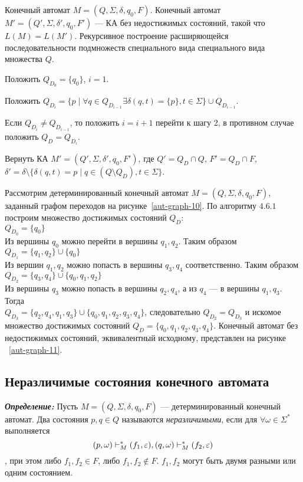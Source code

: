 {
	Конечный автомат $M = (Q,\Sigma, \delta, q_0, F)$.
}
{
	Конечный автомат $M' = (Q',\Sigma, \delta', q_0, F')$ --- КА без недостижимых состояний, такой что $L(M) = L(M')$.
}
{
 Рекурсивное построение расширяющейся последовательности подмножеств специального вида специального вида множества $Q$.
}
{
\item Положить $Q_{D_0}=\{q_0\}$, $i=1$.
\item Положить $Q_{D_i}=\{p \mid  \forall q \in Q_{D_{i-1}} \exists \delta(q, t) = \{p\}, t \in \Sigma  \}\cup Q_{D_{i-1}}$.
\item Если $Q_{D_i}\neq Q_{D_{i-1}}$, то положить $i=i+1$ перейти к шагу 2, в противном случае положить $Q_D=Q_{D_i}$.
\item Вернуть КА $M'=(Q',\Sigma, \delta', q_0, F')$, где $Q'=Q_D\cap Q$, $F'=Q_D\cap F$, $\delta' = \delta \setminus \{ \delta(q, t) = p \mid q \in (Q \setminus Q_D), t \in \Sigma \}$.
}

\begin{myexample}
Рассмотрим детерминированный конечный автомат $M = (Q,\Sigma, \delta, q_0, F)$, заданный графом переходов на рисунке~\ref{aut-graph-10}. По алгоритму $4.6.1$ построим множество достижимых состояний $Q_D$: \\
$Q_{D_0} = \{ q_0 \}$ \\
Из вершины $q_0$ можно перейти в вершины $q_1, q_2$. Таким образом \\
$Q_{D_1} = \{ q_1, q_2 \} \cup \{ q_0 \} $ \\
Из вершин $q_1, q_2$ можно попасть в вершины $q_3, q_4$ соответственно. Таким образом \\
$Q_{D_2} = \{ q_3, q_4 \} \cup \{ q_0, q_1, q_2 \} $ \\
Из вершины $q_3$ можно попасть в вершины $q_2, q_4$, а из $q_4$ --- в вершины $q_1, q_3$. Тогда \\
$Q_{D_3} = \{ q_2, q_4, q_1, q_3 \} \cup \{ q_0, q_1, q_2, q_3, q_4 \} $, следовательно $Q_{D_2} = Q_{D_3}$ и искомое множество достижимых состояний $Q_D = \{ q_0, q_1, q_2, q_3, q_4 \}$.
Конечный автомат без недостижимых состояний, эквивалентный исходному, представлен на рисунке ~\ref{aut-graph-11}.
\end{myexample}




\subsection*{Неразличимые состояния конечного автомата}
\textit{\textbf{Определение:}} Пусть $M = (Q,\Sigma, \delta, q_0, F)$ --- детерминированный конечный автомат. Два состояния $p, q \in Q$ называются \textit{неразличимыми}, если для $\forall \omega \in \Sigma^*$ выполняется \[ (p, \omega) \vdash_M^* (f_1, \varepsilon), (q, \omega) \vdash_M^* (f_2, \varepsilon) \], при этом либо $f_1, f_2 \in F$, либо $f_1, f_2 \notin F$. $f_1, f_2$ могут быть двумя разными или одним состоянием.

